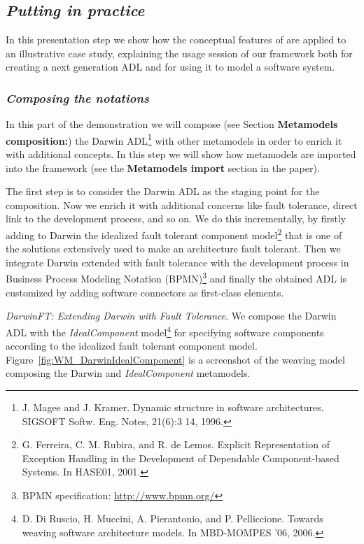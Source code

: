 \subsection{\em Putting in practice \name{}}
In this presentation step we show how the conceptual features of
\name{} are applied to an illustrative case study, explaining the
usage session of our framework both for creating a next generation ADL
and for using it to model a software system.

\subsubsection{\em Composing the notations}
In this part of the demonstration we will compose (see Section {\bf Metamodels composition:}) the Darwin ADL\footnote{J. Magee and
J. Kramer. Dynamic structure in software architectures. SIGSOFT
Softw. Eng. Notes, 21(6):3 14, 1996.}
with other metamodels in order to enrich it with additional concepts.
In this step we will show how metamodels are imported into the \name{} framework
(see the {\bf Metamodels import} section in the paper).

The first step is to consider the Darwin ADL as the staging point for the
composition. Now we enrich it with additional concerns
like fault tolerance, direct link to the development process, and so
on. We do this incrementally, by firstly adding to Darwin the
idealized fault tolerant component model\footnote{G. Ferreira, C. M.
Rubira, and R. de Lemos. Explicit Representation of Exception
Handling in the Development of Dependable Component-based Systems.
In HASE01, 2001.} that is one of the solutions extensively used to
make an architecture fault tolerant. Then we integrate Darwin
extended with fault tolerance with the development process in
Business Process Modeling Notation (BPMN)\footnote{BPMN
specification: \small{\url{http://www.bpmn.org/}}} and finally the
obtained ADL is customized by adding software connectors as
first-class elements.

\noindent \emph{DarwinFT: Extending Darwin with Fault Tolerance}. We
compose the Darwin ADL with the \textit{IdealComponent}
model\footnote{D. Di Ruscio, H. Muccini, A. Pierantonio, and P.
Pelliccione. Towards weaving software architecture models. In
MBD-MOMPES '06, 2006.} for specifying software components according
to the idealized fault tolerant component model.
Figure~\ref{fig:WM_DarwinIdealComponent} is a screenshot of the
weaving model composing the Darwin and \textit{IdealComponent}
metamodels.

